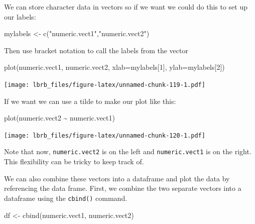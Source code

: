\documentclass[
]{book}
\newenvironment{Shaded}{\begin{snugshade}}{\end{snugshade}}
\newcommand{\AttributeTok}[1]{\textcolor[rgb]{0.77,0.63,0.00}{#1}}
\newcommand{\DecValTok}[1]{\textcolor[rgb]{0.00,0.00,0.81}{#1}}
\newcommand{\FunctionTok}[1]{\textcolor[rgb]{0.00,0.00,0.00}{#1}}
\newcommand{\NormalTok}[1]{#1}
\newcommand{\OtherTok}[1]{\textcolor[rgb]{0.56,0.35,0.01}{#1}}
\newcommand{\SpecialCharTok}[1]{\textcolor[rgb]{0.00,0.00,0.00}{#1}}
\newcommand{\StringTok}[1]{\textcolor[rgb]{0.31,0.60,0.02}{#1}}
\begin{document}
We can store character data in vectors so if we want we could do this to set up our labels:

\begin{Shaded}
\begin{Highlighting}[]
\NormalTok{mylabels }\OtherTok{\textless{}{-}}  \FunctionTok{c}\NormalTok{(}\StringTok{"numeric.vect1"}\NormalTok{,}\StringTok{"numeric.vect2"}\NormalTok{)}
\end{Highlighting}
\end{Shaded}

Then use bracket notation to call the labels from the vector

\begin{Shaded}
\begin{Highlighting}[]
\FunctionTok{plot}\NormalTok{(numeric.vect1, }
\NormalTok{     numeric.vect2, }
     \AttributeTok{xlab=}\NormalTok{mylabels[}\DecValTok{1}\NormalTok{],}
     \AttributeTok{ylab=}\NormalTok{mylabels[}\DecValTok{2}\NormalTok{])}
\end{Highlighting}
\end{Shaded}

\texttt{[image: lbrb\_files/figure-latex/unnamed-chunk-119-1.pdf]}

If we want we can use a tilde to make our plot like this:

\begin{Shaded}
\begin{Highlighting}[]
\FunctionTok{plot}\NormalTok{(numeric.vect2 }\SpecialCharTok{\textasciitilde{}}\NormalTok{ numeric.vect1)}
\end{Highlighting}
\end{Shaded}

\texttt{[image: lbrb\_files/figure-latex/unnamed-chunk-120-1.pdf]}

Note that now, \texttt{numeric.vect2} is on the left and \texttt{numeric.vect1} is on the right. This flexibility can be tricky to keep track of.

We can also combine these vectors into a dataframe and plot the data by referencing the data frame. First, we combine the two separate vectors into a dataframe using the \texttt{cbind()} command.

\begin{Shaded}
\begin{Highlighting}[]
\NormalTok{df }\OtherTok{\textless{}{-}} \FunctionTok{cbind}\NormalTok{(numeric.vect1, numeric.vect2)}
\end{Highlighting}
\end{Shaded}
\end{document}
